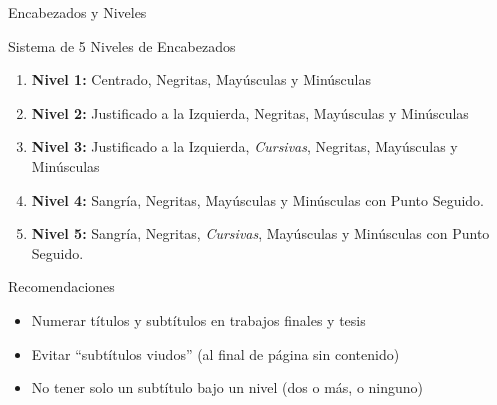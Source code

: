 \documentclass[spanish,aspectratio=169]{beamer}
\begin{document}
	\begin{frame}{Encabezados y Niveles}
		\begin{block}{Sistema de 5 Niveles de Encabezados}
			\small
			\begin{enumerate}
				\item \textbf{Nivel 1:} Centrado, Negritas, Mayúsculas y Minúsculas
				\item \textbf{Nivel 2:} Justificado a la Izquierda, Negritas, Mayúsculas y Minúsculas
				\item \textbf{Nivel 3:} Justificado a la Izquierda, \textit{Cursivas}, Negritas, Mayúsculas y Minúsculas
				\item \textbf{Nivel 4:} Sangría, Negritas, Mayúsculas y Minúsculas con Punto Seguido.
				\item \textbf{Nivel 5:} Sangría, Negritas, \textit{Cursivas}, Mayúsculas y Minúsculas con Punto Seguido.
			\end{enumerate}
		\end{block}
		
		\begin{alertblock}{Recomendaciones}
			\begin{itemize}
				\item Numerar títulos y subtítulos en trabajos finales y tesis
				\item Evitar ``subtítulos viudos'' (al final de página sin contenido)
				\item No tener solo un subtítulo bajo un nivel (dos o más, o ninguno)
			\end{itemize}
		\end{alertblock}
	\end{frame}
	
\end{document}
